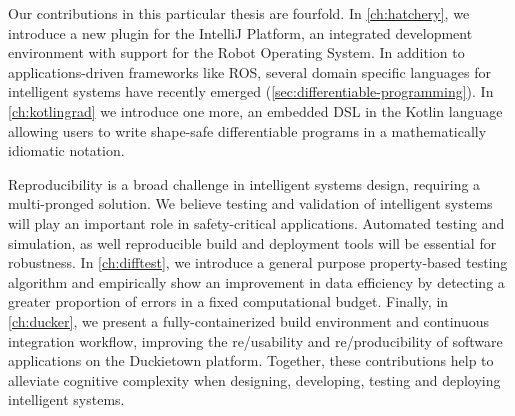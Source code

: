 Our contributions in this particular thesis are fourfold. In \autoref{ch:hatchery}, we introduce a new plugin for the IntelliJ Platform, an integrated development environment with support for the Robot Operating System. In addition to applications-driven frameworks like ROS, several domain specific languages for intelligent systems have recently emerged (\autoref{sec:differentiable-programming}). In \autoref{ch:kotlingrad} we introduce one more, an embedded DSL in the Kotlin language allowing users to write shape-safe differentiable programs in a mathematically idiomatic notation.

Reproducibility is a broad challenge in intelligent systems design, requiring a multi-pronged solution. We believe testing and validation of intelligent systems will play an important role in safety-critical applications. Automated testing and simulation, as well reproducible build and deployment tools will be essential for robustness. In \autoref{ch:difftest}, we introduce a general purpose property-based testing algorithm and empirically show an improvement in data efficiency by detecting a greater proportion of errors in a fixed computational budget. Finally, in \autoref{ch:ducker}, we present a fully-containerized build environment and continuous integration workflow, improving the re/usability and re/producibility of software applications on the Duckietown platform. Together, these contributions help to alleviate cognitive complexity when designing, developing, testing and deploying intelligent systems.